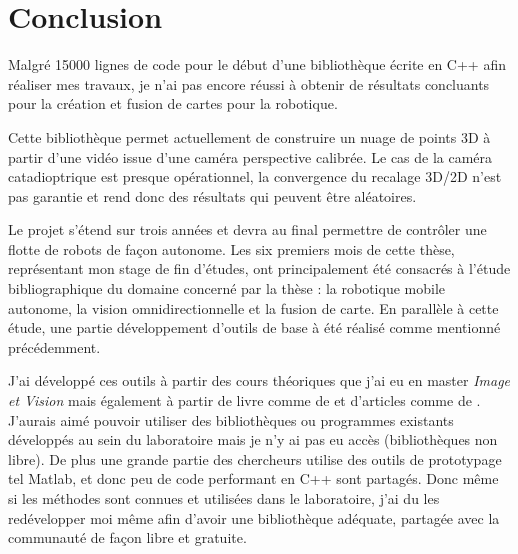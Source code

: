 \section{Conclusion}

Malgré 15000 lignes de code pour le début d'une bibliothèque écrite en C++ afin réaliser mes travaux, je n'ai pas encore réussi à obtenir de résultats concluants pour la création et fusion de cartes pour la robotique.

Cette bibliothèque permet actuellement de construire un nuage de points 3D à partir d'une vidéo issue d'une caméra perspective calibrée.
Le cas de la caméra catadioptrique est presque opérationnel, la convergence du recalage 3D/2D n'est pas garantie et rend donc des résultats qui peuvent être aléatoires.

Le projet s'étend sur trois années et devra au final permettre de contrôler une flotte de robots de façon autonome.
Les six premiers mois de cette thèse, représentant mon stage de fin d'études, ont principalement été consacrés à l'étude bibliographique du domaine concerné par la thèse : la robotique mobile autonome, la vision omnidirectionnelle et la fusion de carte.
En parallèle à cette étude, une partie développement d'outils de base à été réalisé comme mentionné précédemment.

J'ai développé ces outils à partir des cours théoriques que j'ai eu en master \emph{Image et Vision} mais également à partir de livre comme 
de 
\citeauthor{Hartley03Book} 
\cite{Hartley03Book} 
et d'articles comme
de 
\citeauthor{Puig08} 
\cite{Puig08}.
J'aurais aimé pouvoir utiliser des bibliothèques ou programmes existants développés au sein du laboratoire mais je n'y ai pas eu accès (bibliothèques non libre). De plus une grande partie des chercheurs utilise des outils de prototypage tel Matlab, et donc peu de code performant en C++ sont partagés. Donc même si les méthodes sont connues et utilisées dans le laboratoire, j'ai du les redévelopper moi même afin d'avoir une bibliothèque adéquate, partagée avec la communauté de façon libre et gratuite.
